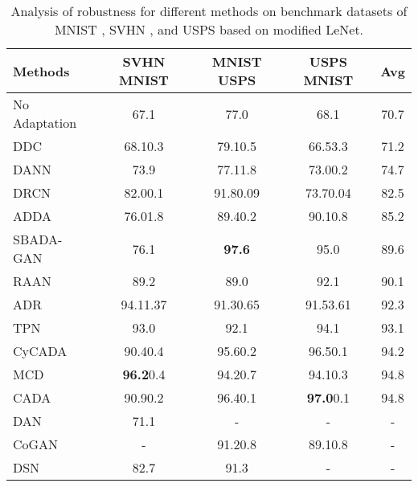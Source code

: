 \documentclass[letterpaper]{article} \usepackage{aaai20}  \usepackage{times}  \usepackage{helvet} \usepackage{courier}  \usepackage[hyphens]{url}  \usepackage{graphicx} \urlstyle{rm} \def\UrlFont{\rm}  \usepackage{graphicx}  \frenchspacing  \setlength{\pdfpagewidth}{8.5in}  \setlength{\pdfpageheight}{11in}
\begin{document}
\begin{table*}
	\caption{Analysis of robustness for different methods on benchmark datasets of MNIST \cite{mnist}, SVHN \cite{svhn}, and USPS \cite{usps} based on modified LeNet.}
	\label{table:results_digits} 
	\begin{center}
		\begin{tabular}{lcccc}
			\hline
			Methods                 & SVHN  MNIST & MNIST  USPS & USPS  MNIST & Avg \\
			\hline
			No Adaptation           & 67.1 & 77.0 & 68.1 & 70.7 \\ 

			DDC \cite{ddc}          & 68.10.3 & 79.10.5 & 66.53.3 & 71.2 \\ 

			DANN \cite{dann}        & 73.9 & 77.11.8 & 73.00.2 & 74.7 \\ 

			DRCN \cite{drcn}        & 82.00.1 & 91.80.09 & 73.70.04 & 82.5 \\ 

			ADDA \cite{adda}        & 76.01.8 & 89.40.2 & 90.10.8 & 85.2 \\ 

			SBADA-GAN \cite{sbada_gan} & 76.1 & \textbf{97.6} & 95.0 & 89.6 \\ 

			RAAN \cite{raan}        & 89.2 & 89.0 & 92.1 & 90.1 \\ 

			ADR \cite{adr}          & 94.11.37 & 91.30.65 & 91.53.61 & 92.3 \\ 

			TPN \cite{tpn}          & 93.0 & 92.1 & 94.1 & 93.1 \\ 

			CyCADA \cite{cycada}    & 90.40.4 & 95.60.2 & 96.50.1 & 94.2 \\ 

			MCD \cite{mcd}          & \textbf{96.2}0.4 & 94.20.7 & 94.10.3 & 94.8 \\ 

			CADA \cite{cons_ada}        & 90.90.2 & 96.40.1 & \textbf{97.0}0.1 & 94.8 \\ 

			DAN \cite{dan}          & 71.1 & - & - & - \\ 

			CoGAN \cite{cogan}      & - & 91.20.8 & 89.10.8 & - \\ 

			DSN \cite{dsn}         & 82.7 & 91.3 & - & - \\ 


\end{tabular}
\end{center}
\end{table*}
\end{document}
